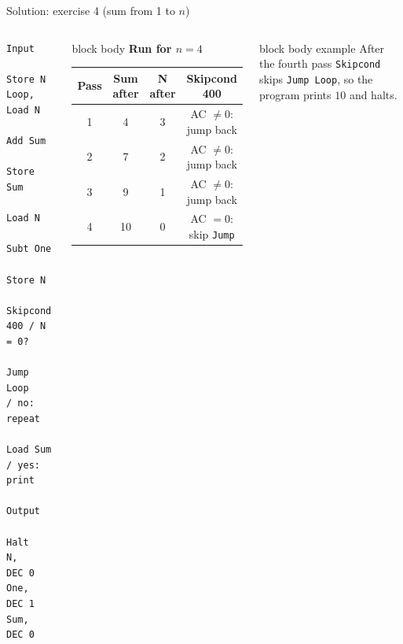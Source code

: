 \documentclass[aspectratio=169,10pt]{beamer}
\begin{document}
\begin{frame}[fragile]{Solution: exercise 4 (sum from 1 to $n$)}
  \begin{columns}[T,onlytextwidth]
\begin{lstlisting}[style=marie]
      Input
      Store N
Loop, Load N
      Add Sum
      Store Sum
      Load N
      Subt One
      Store N
      Skipcond 400 / N = 0?
      Jump Loop    / no: repeat
      Load Sum     / yes: print
      Output
      Halt
N,    DEC 0
One,  DEC 1
Sum,  DEC 0
\end{lstlisting}
      \begin{beamercolorbox}[rounded=true,sep=0.1cm,wd=\linewidth]{block body}
        \footnotesize
        \textbf{Run for $n = 4$}\\[0.05cm]
        \scriptsize
        \renewcommand{\arraystretch}{1.15}
        \begin{tabular}{cccc}
          \toprule
          \textbf{Pass} & \textbf{Sum after} & \textbf{N after} & \textbf{Skipcond 400} \\
          \midrule
          1 & 4 & 3 & AC $\neq 0$: jump back \\
          2 & 7 & 2 & AC $\neq 0$: jump back \\
          3 & 9 & 1 & AC $\neq 0$: jump back \\
          4 & 10 & 0 & AC $= 0$: skip \texttt{Jump} \\
          \bottomrule
        \end{tabular}
      \end{beamercolorbox}
      \vspace{0.1cm}
      \begin{beamercolorbox}[rounded=true,sep=0.1cm,wd=\linewidth]{block body example}
        \footnotesize
        After the fourth pass \texttt{Skipcond} skips \texttt{Jump Loop}, so the program prints $10$ and halts.
      \end{beamercolorbox}
  \end{columns}
\end{frame}
\end{document}

